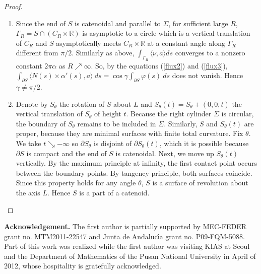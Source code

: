 \documentclass[12pt,a4paper]{amsart}
\begin{document}
\begin{proof}
\begin{enumerate}
\item Since the end of $S$ is catenoidal and parallel to $\Sigma$, for sufficient large $R$, $\Gamma_R=S\cap (C_R\times{\mathbb R})$ is asymptotic to a circle which is a vertical translation of $C_{R}$ and $S$ asymptotically meets $C_R\times{\mathbb R}$ at a constant angle along $\Gamma_R$ different from $\pi/2$. Similarly as above, $\int_{\Gamma_R}\langle \nu,a\rangle ds$ converges to a nonzero constant $2\pi\alpha$ as $R\nearrow\infty$. So, by the equations (\ref{flux2}) and (\ref{flux3}), $\int_{\partial S}\langle N(s)\times\alpha'(s),a\rangle\ ds= \cos\gamma\int_{\partial S}\varphi(s)\ ds$ does not vanish. Hence $\gamma\not=\pi/2$.
\item Denote by $S_\theta$ the rotation of $S$ about $L$ and $S_\theta(t)=S_\theta+(0,0,t)$ the vertical translation of $S_\theta$ of height $t$. Because the right cylinder $\Sigma$ is circular, the boundary of $S_\theta$ remains to be included in $\Sigma$. Similarly, $S$ and $S_\theta(t)$ are proper, because they are minimal surfaces with finite total curvature. Fix $\theta$. We take $t\searrow -\infty$ so $\partial S_\theta$ is disjoint of $\partial S_\theta(t)$, which it is possible because $\partial S$ is compact and the end of $S$ is catenoidal. Next, we move up $S_\theta(t)$ vertically. By the maximum principle at infinity, the first contact point occurs between the boundary points. By tangency principle, both surfaces coincide. Since this property holds for any angle $\theta$, $S$ is a surface of revolution about the axis $L$. Hence $S$ is a part of a catenoid.
\end{enumerate}
\end{proof}

\textbf{Acknowledgement.} The first author is partially supported by MEC-FEDER
grant no. MTM2011-22547 and
Junta de Andaluc\'{\i}a grant no. P09-FQM-5088. Part of this work was realized while the first author was visiting KIAS at Seoul and the Department of Mathematics of the Pusan National University in April of 2012, whose hospitality is gratefully acknowledged.
\end{document}
